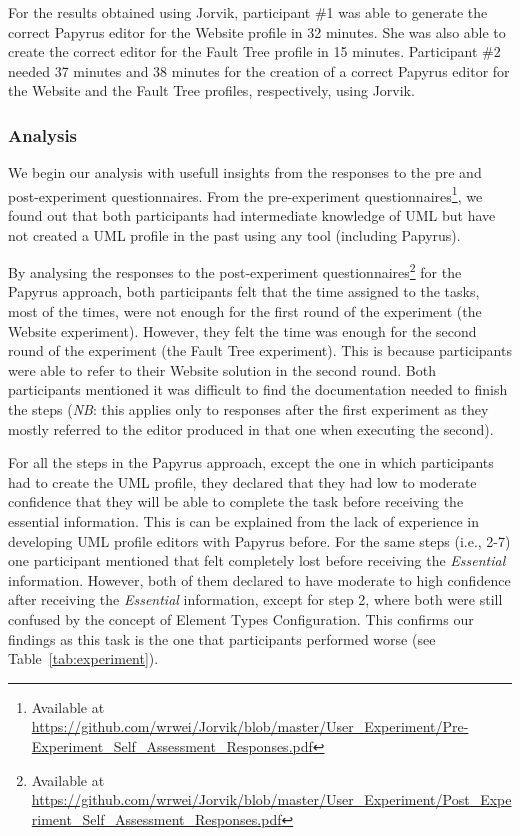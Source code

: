 For the results obtained using Jorvik, participant \#1 was able to generate the correct Papyrus editor for the Website profile in 32 minutes. She was also able to create the correct editor for the Fault Tree profile in 15 minutes.
Participant \#2 needed 37 minutes and 38 minutes for the creation of a correct Papyrus editor for the Website and the Fault Tree profiles, respectively, using Jorvik.


\subsubsection{Analysis} 
We begin our analysis with usefull insights from the responses to the pre and post-experiment questionnaires.
From the pre-experiment questionnaires\footnote{Available at \url{https://github.com/wrwei/Jorvik/blob/master/User_Experiment/Pre-Experiment_Self_Assessment_Responses.pdf}}, we found out that both participants had intermediate knowledge of UML but have not created a UML profile in the past using any tool (including Papyrus).

By analysing the responses to the post-experiment questionnaires\footnote{Available at \url{https://github.com/wrwei/Jorvik/blob/master/User_Experiment/Post_Experiment_Self_Assessment_Responses.pdf}} for the Papyrus approach,
both participants felt that the time assigned to the tasks, most of the times, were not enough for the first round of the experiment (the Website experiment). However, they felt the time was enough for the second round of the experiment (the Fault Tree experiment). This is because participants were able to refer to their Website solution in the second round. Both participants mentioned it was difficult to find the documentation needed to finish the steps (\textit{NB}: this applies only to responses after the first experiment as they mostly referred to the editor produced in that one when executing the second).

For all the steps in the Papyrus approach, except the one in which participants had to create the UML profile, they declared that they had low to moderate confidence that they will be able to complete the task before receiving the essential information. This is can be explained from the lack of experience in developing UML profile editors with Papyrus before. For the same steps (i.e., 2-7) one participant mentioned that felt completely lost before receiving the \textit{Essential} information. However, both of them declared to have moderate to high confidence after receiving the \textit{Essential} information, except for step 2, where both were still confused by the concept of Element Types Configuration. This confirms our findings as this task is the one that participants performed worse (see Table~\ref{tab:experiment}). 
	
